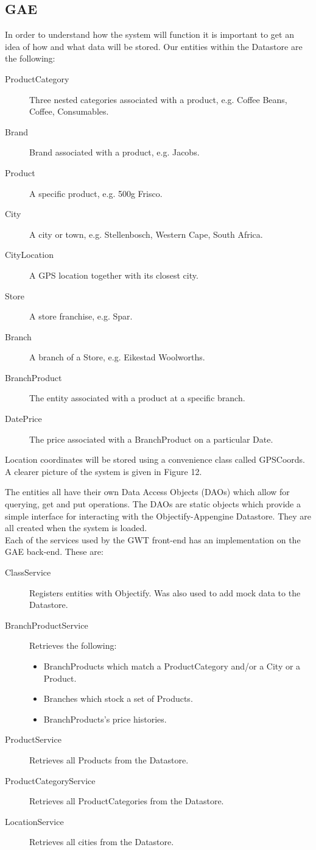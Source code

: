 \subsection{GAE}
In order to understand how the system will function it is important to get an idea of how and what data will be stored.
Our entities within the Datastore are the following:
\begin{description}
\item [ProductCategory] Three nested categories associated with a product, e.g. Coffee Beans, Coffee, Consumables.
\item [Brand] Brand associated with a product, e.g. Jacobs.
\item[Product] A specific product, e.g. 500g Frisco.
\item [City] A city or town, e.g. Stellenbosch, Western Cape, South Africa.
\item [CityLocation] A GPS location together with its closest city.
\item [Store] A store franchise, e.g. Spar.
\item [Branch] A branch of a Store, e.g. Eikestad Woolworths.
\item [BranchProduct] The entity associated with a product at a specific branch.
\item [DatePrice] The price associated with a BranchProduct on a particular Date.
\end{description}
Location coordinates will be stored using a convenience class called GPSCoords.
A clearer picture of the system is given in Figure 12.

The entities all have their own Data Access Objects (DAOs) which allow for querying, get and put operations. The DAOs are 
static objects which provide a simple interface for interacting with the Objectify-Appengine Datastore. They are all created when the system is loaded. \\
Each of the services used by the GWT front-end has an implementation on the GAE back-end. These are:
\begin{description}
\item[ClassService] Registers entities with Objectify. Was also used to add mock data to the Datastore.
\item[BranchProductService] Retrieves the following:
\begin{itemize}
\item BranchProducts which match a ProductCategory and/or a City or a Product.
\item Branches which stock a set of Products.
\item BranchProducts's price histories.
\end{itemize}
\item[ProductService] Retrieves all Products from the Datastore.
\item[ProductCategoryService] Retrieves all ProductCategories from the Datastore.
\item[LocationService] Retrieves all cities from the Datastore.
\end{description}

